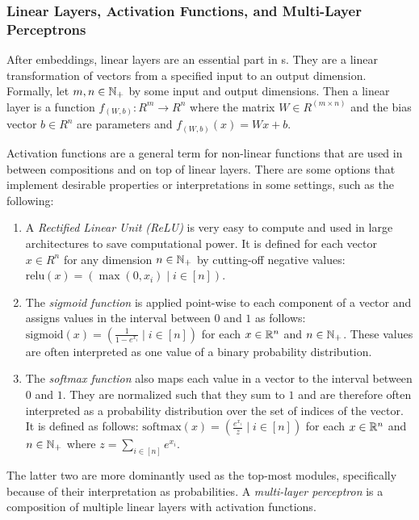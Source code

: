 \documentclass[../document.tex]{subfiles}
\begin{document}
    \subsubsection{Linear Layers, Activation Functions, and Multi-Layer Perceptrons}
    After embeddings, linear layers are an essential part in s.
    They are a linear transformation of vectors from a specified input to an output dimension.
    Formally, let \(m, n \in \mathbb{N}_+\) by some input and output dimensions.
    Then a linear layer is a function \(f_{(W,b)}\colon R^m \to R^n\) where the matrix \(W \in R^{(m\times n)}\) and the bias vector \(b\in R^n\) are parameters and \(f_{(W,b)}(x) = Wx+b\).

    Activation functions are a general term for non-linear functions that are used in between compositions and on top of linear layers.
    There are some options that implement desirable properties or interpretations in some settings, such as the following:
    \begin{enumerate}
        \item
            A \emph{Rectified Linear Unit (ReLU)} is very easy to compute and used in large architectures to save computational power.
            It is defined for each vector \(x\in R^n\) for any dimension \(n \in \mathbb{N}_+\) by cutting-off negative values: \(\mathrm{relu}(x) = (\max(0, x_i) \mid i \in [n])\).
        \item
            The \emph{sigmoid function} is applied point-wise to each component of a vector and assigns values in the interval between \(0\) and \(1\) as follows: \(\mathrm{sigmoid}(x) = (\frac{1}{1-e^{x_i}} \mid i \in [n])\) for each \(x \in \mathbb{R}^n\) and \(n \in \mathbb{N}_+\).
            These values are often interpreted as one value of a binary probability distribution.
        \item
            The \emph{softmax function} also maps each value in a vector to the interval between \(0\) and \(1\).
            They are normalized such that they sum to \(1\) and are therefore often interpreted as a probability distribution over the set of indices of the vector.
            It is defined as follows: \(\mathrm{softmax}(x) = (\frac{e^{x_i}}{z} \mid i \in [n])\) for each \(x\in \mathbb{R}^n\) and \(n \in \mathbb{N}_+\) where \(z = \sum_{i \in [n]} e^{x_i}\).
    \end{enumerate}
    The latter two are more dominantly used as the top-most modules, specifically because of their interpretation as probabilities.
    A \emph{multi-layer perceptron} is a composition of multiple linear layers with activation functions.
\end{document}
